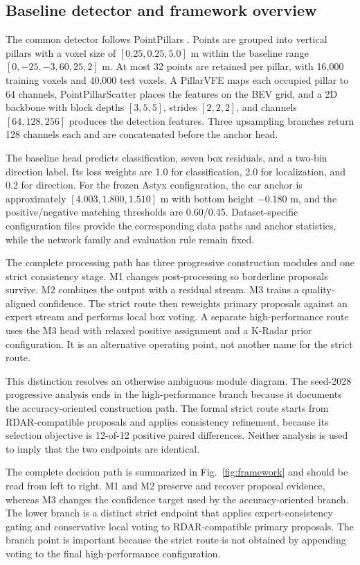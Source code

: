 \documentclass[preprint,12pt,times]{elsarticle}
\newcommand{\figref}[1]{\textcolor{floatreviewblue}{Fig.~\ref{#1}}}
\newcommand{\figref}[1]{Fig.~\ref{#1}}
\begin{document}
\subsection{Baseline detector and framework overview}

The common detector follows PointPillars
\cite{lang2019pointpillars}. Points are grouped into vertical pillars with a
voxel size of $[0.25,0.25,5.0]$ m within the baseline range
$[0,-25,-3,60,25,2]$ m. At most 32 points are retained per pillar, with
16,000 training voxels and 40,000 test voxels. A PillarVFE maps each occupied
pillar to 64 channels, PointPillarScatter places the features on the BEV grid,
and a 2D backbone with block depths $[3,5,5]$, strides $[2,2,2]$, and channels
$[64,128,256]$ produces the detection features. Three upsampling branches
return 128 channels each and are concatenated before the anchor head.

The baseline head predicts classification, seven box residuals, and a
two-bin direction label. Its loss weights are 1.0 for classification, 2.0 for
localization, and 0.2 for direction. For the frozen Astyx configuration, the
car anchor is approximately $[4.003,1.800,1.510]$ m with bottom height
$-0.180$ m, and the positive/negative matching thresholds are 0.60/0.45.
Dataset-specific configuration files provide the corresponding data paths and
anchor statistics, while the network family and evaluation rule remain fixed.

The complete processing path has three progressive construction modules and
one strict consistency stage. M1 changes post-processing so borderline
proposals survive. M2 combines the output with a residual stream. M3 trains a
quality-aligned confidence. The strict route then reweights primary proposals
against an expert stream and performs local box voting. A separate
high-performance route uses the M3 head with relaxed positive assignment and a
K-Radar prior configuration. It is an alternative operating point, not another
name for the strict route.

This distinction resolves an otherwise ambiguous module diagram. The
seed-2028 progressive analysis ends in the high-performance branch because it
documents the accuracy-oriented construction path. The formal strict
route starts from RDAR-compatible proposals and applies consistency refinement,
because its selection objective is 12-of-12 positive paired differences.
Neither analysis is used to imply that the two endpoints are identical.

The complete decision path is summarized in \figref{fig:framework} and should
be read from left to right. M1 and M2 preserve and recover proposal evidence,
whereas M3 changes the confidence target used by the accuracy-oriented branch.
The lower branch is a distinct strict endpoint that applies expert-consistency
gating and conservative local voting to RDAR-compatible primary proposals.
The branch point is important because the strict route is not obtained by
appending voting to the final high-performance configuration.
\end{document}
